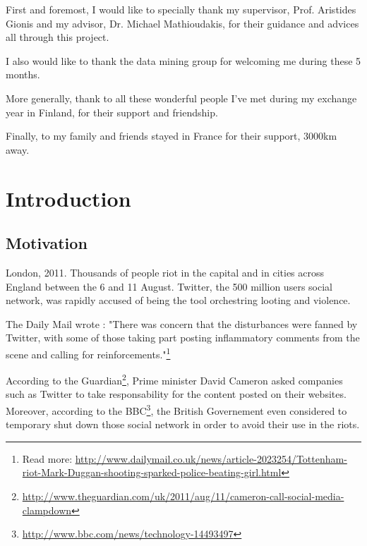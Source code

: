 \documentclass[a4paper,12pt]{report}
\begin{document}
First and foremost, I would like to specially thank my supervisor, Prof. Aristides Gionis and my advisor, Dr. Michael Mathioudakis, for their guidance and advices all through this project. 

I also would like to thank the data mining group for welcoming me during these 5 months.

More generally, thank to all these wonderful people I've met during my exchange year in Finland, for their support and friendship.

Finally, to my family and friends stayed in France for their support, 3000km away.

\restoregeometry


 


\chapter{Introduction}

\section{Motivation}

London, 2011. Thousands of people riot in the capital and in cities across England between the 6 and 11 August. Twitter, the 500 million users social network, was rapidly accused of being the tool orchestring looting and violence.

The Daily Mail wrote : 
"There was concern that the disturbances were fanned by Twitter, with some of those taking part posting inflammatory comments from the scene and calling for reinforcements."\footnote{\noindent Read more: \url{http://www.dailymail.co.uk/news/article-2023254/Tottenham-riot-Mark-Duggan-shooting-sparked-police-beating-girl.html}}

According to the Guardian\footnote{\url{http://www.theguardian.com/uk/2011/aug/11/cameron-call-social-media-clampdown}}, Prime minister David Cameron asked companies such as Twitter to take responsability for the content posted on their websites. Moreover, according to the BBC\footnote{\url{http://www.bbc.com/news/technology-14493497}}, the British Governement even considered to temporary shut down those social network in order to avoid their use in the riots.
\end{document}
